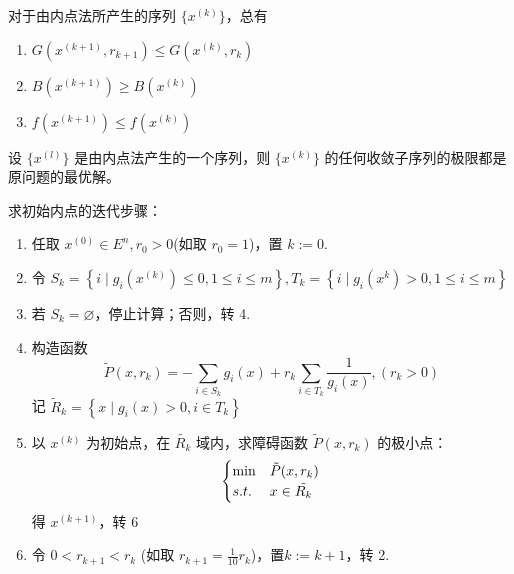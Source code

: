 \begin{theorem}
    对于由内点法所产生的序列 $\{x^{(k)}\}$，总有\begin{enumerate}
        \item $G(x^{(k + 1)}, r_{k + 1}) \le G(x^{(k)}, r_k)$
        \item $B(x^{(k + 1)}) \ge B(x^{(k)})$
        \item $f(x^{(k + 1)}) \le f(x^{(k)})$
    \end{enumerate}
\end{theorem}

\begin{theorem}
    设 $\{x^{(l)}\}$ 是由内点法产生的一个序列，则 $\{x^{(k)}\}$ 的任何收敛子序列的极限都是原问题的最优解。
\end{theorem}

\begin{note}
    求初始内点的迭代步骤：\begin{enumerate}
        \item 任取 $x^{(0)} \in E^n, r_0 > 0$(如取 $r_0 = 1$)，置 $k := 0$.
        \item 令 $S_k = \left\{i \mid g_i(x^{(k)}) \le 0, 1 \le i \le m\right\}, T_k = \left\{i \mid g_i(x^{k}) > 0, 1 \le i \le m\right\}$
        \item 若 $S_k = \varnothing$，停止计算；否则，转 4.
        \item 构造函数 \[\widetilde{P}\left(x, r_{k}\right)=-\sum_{i \in S_{k}} g_{i}(x)+r_{k} \sum_{i \in T_{k}} \frac{1}{g_{i}(x)},\left(r_{k}>0\right)\]
        记 $\widetilde{R}_{k}=\left\{x \mid g_{i}(x)>0 ,i \in T_{k}\right\}$
        \item 以 $x^{(k)}$ 为初始点，在 $\tilde{R_k}$ 域内，求障碍函数 $\tilde{P}(x, r_k)$ 的极小点：\[\begin{cases}
            \min &\tilde{P}(x, r_k)\\
            s.t. & x \in \tilde{R_k}
        \end{cases}\] 得 $x^{(k + 1)}$，转 6
        \item 令 $ 0 < r_{k + 1} < r_k$ (如取 $r_{k + 1} = \frac{1}{10}r_k$)，置$k:=k+1$，转 2.
    \end{enumerate}
\end{note}

